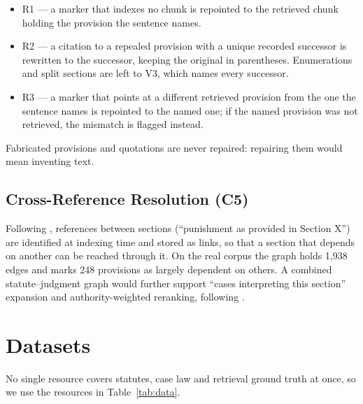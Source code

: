 \documentclass[conference]{IEEEtran}
\begin{document}
\begin{itemize}
\item R1 --- a marker that indexes no chunk is repointed to the retrieved chunk holding the provision the sentence names.
\item R2 --- a citation to a repealed provision with a unique recorded successor is rewritten to the successor, keeping the original in parentheses. Enumerations and split sections are left to V3, which names every successor.
\item R3 --- a marker that points at a different retrieved provision from the one the sentence names is repointed to the named one; if the named provision was not retrieved, the mismatch is flagged instead.
\end{itemize}

Fabricated provisions and quotations are never repaired: repairing them would mean inventing text.

\subsection{Cross-Reference Resolution (C5)}

Following \cite{rustamov2025}, references between sections (``punishment as provided in Section X'') are identified at indexing time and stored as links, so that a section that depends on another can be reached through it. On the real corpus the graph holds 1,938 edges and marks 248 provisions as largely dependent on others. A combined statute--judgment graph would further support ``cases interpreting this section'' expansion and authority-weighted reranking, following \cite{bindra2026}.

\section{Datasets}

No single resource covers statutes, case law and retrieval ground truth at once, so we use the resources in Table~\ref{tab:data}.
\end{document}

